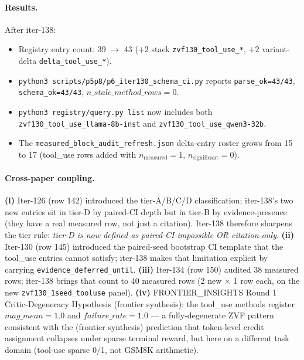 \paragraph{Results.}
After iter-138:
\begin{itemize}
\item Registry entry count: 39 $\to$ 43
  ($+2$ stack \texttt{zvf130\_tool\_use\_*},
  $+2$ variant-delta \texttt{delta\_tool\_use\_*}).
\item \texttt{python3 scripts/p5p8/p6\_iter130\_schema\_ci.py} reports
  \texttt{parse\_ok=43/43}, \texttt{schema\_ok=43/43},
  $\mathit{n\_stale\_method\_rows}=0$.
\item \texttt{python3 registry/query.py list} now includes both
  \texttt{zvf130\_tool\_use\_llama-8b-inst} and
  \texttt{zvf130\_tool\_use\_qwen3-32b}.
\item The \texttt{measured\_block\_audit\_refresh.json} delta-entry
  roster grows from 15 to 17 (tool\_use rows added with
  $n_{\text{measured}}=1$, $n_{\text{significant}}=0$).
\end{itemize}

\paragraph{Cross-paper coupling.}
\textbf{(i)} Iter-126 (row 142) introduced the tier-A/B/C/D
classification; iter-138's two new entries sit in tier-D by paired-CI
depth but in tier-B by evidence-presence (they have a real measured
row, not just a citation). Iter-138 therefore sharpens the tier rule:
\emph{tier-D is now defined as paired-CI-impossible OR
citation-only}. \textbf{(ii)} Iter-130 (row 145) introduced the
paired-seed bootstrap CI template that the tool\_use entries cannot
satisfy; iter-138 makes that limitation explicit by carrying
\texttt{evidence\_deferred\_until}. \textbf{(iii)} Iter-134 (row 150)
audited 38 measured rows; iter-138 brings that count to 40 measured
rows (2 new $\times$ 1 row each, on the new \texttt{zvf130\_1seed\_tooluse}
panel). \textbf{(iv)} FRONTIER\_INSIGHTS Round 1 Critic-Degeneracy
Hypothesis (frontier synthesis): the tool\_use methods register
$\mathit{mag\_mean}=1.0$ and $\mathit{failure\_rate}=1.0$ --- a
fully-degenerate ZVF pattern consistent with the (frontier synthesis)
prediction that token-level credit assignment collapses under sparse
terminal reward, but here on a different task domain (tool-use
sparse 0/1, not GSM8K arithmetic).